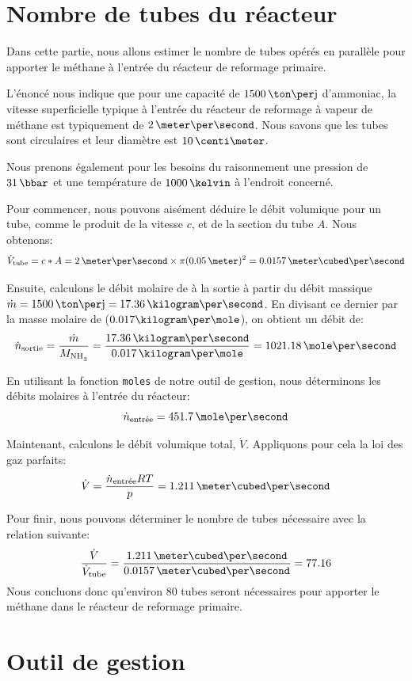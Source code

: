 \documentclass[a4paper,12pt]{article}
\begin{document}
\section{Nombre de tubes du réacteur}

Dans cette partie, nous allons estimer le nombre de tubes opérés
en parallèle pour apporter le méthane à l'entrée du réacteur de reformage primaire.

L’énoncé nous indique que pour une capacité de $1500\,\ton\per\jour$ d’ammoniac,
la vitesse superficielle typique à l’entrée du réacteur de reformage
à vapeur de méthane est typiquement de $2\,\meter\per\second$.
Nous savons que les tubes sont circulaires et leur diamètre est $10\,\centi\meter$.

Nous prenons également pour les besoins du raisonnement
une pression de $31\,\bbar$ et une température de $1000\,\kelvin$
à l'endroit concerné.

Pour commencer, nous pouvons aisément déduire le débit volumique pour un tube,
comme le produit de la vitesse $c$, et de la section du tube $A$.
Nous obtenons:
\begin{equation*}
    \dot{V}\ind{tube} = c*A = 2\,\meter\per\second \times \pi(0.05\,\meter)^2
    = 0.0157\,\meter\cubed\per\second
\end{equation*}

Ensuite, calculons le débit molaire de  à la sortie
à partir du débit massique $\dot{m} = 1500\,\ton\per\jour = 17.36\,\kilogram\per\second$.
En divisant ce dernier par la masse molaire de  ($0.017\kilogram\per\mole$),
on obtient un débit de:
\begin{equation*}
    \dot{n}\ind{sortie} = \frac{\dot{m}}{M_{\ce{NH3}}}
    = \frac{17.36\,\kilogram\per\second}{0.017\,\kilogram\per\mole}
    = 1021.18\,\mole\per\second
\end{equation*}

En utilisant la fonction \texttt{moles} de notre outil de gestion,
nous déterminons les débits molaires à l'entrée du réacteur:
\begin{equation*}
    \dot{n}\ind{entrée} = 451.7\,\mole\per\second
\end{equation*}

Maintenant, calculons le débit volumique total, $\dot{V}$.
Appliquons pour cela la loi des gaz parfaits:
\begin{equation*}
    \dot{V} = \frac{\dot{n}\ind{entrée}RT}{p} = 1.211\,\meter\cubed\per\second
\end{equation*}

Pour finir, nous pouvons déterminer
le nombre de tubes nécessaire avec la relation suivante:
\begin{equation*}
    \frac{\dot{V}}{\dot{V}\ind{tube}}
    = \frac{1.211\,\meter\cubed\per\second}{0.0157\,\meter\cubed\per\second} = 77.16
\end{equation*}
Nous concluons donc qu'environ 80 tubes seront nécessaires pour apporter le méthane
dans le réacteur de reformage primaire.

\section{Outil de gestion}

\printbibliography[heading=bibintoc]
\end{document}

